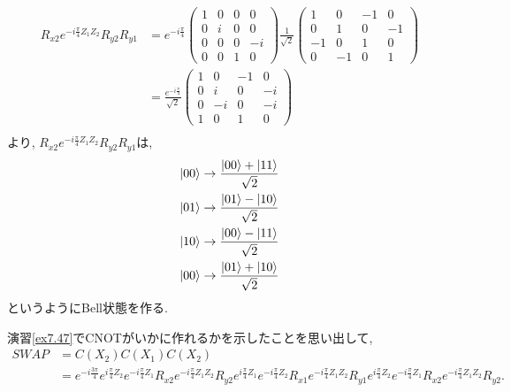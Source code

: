 \begin{ex}
    \label{ex7.48}
    \begin{align*}
        R_{x2} e^{-i \frac{\pi}{4} Z_1 Z_2} R_{y2}R_{y1}
         & =
        e^{-i\frac{\pi}{4}}
        \begin{pmatrix}
            1 & 0 & 0 & 0  \\
            0 & i & 0 & 0  \\
            0 & 0 & 0 & -i \\
            0 & 0 & 1 & 0
        \end{pmatrix}
        \frac{1}{\sqrt{2}}
        \begin{pmatrix}
            1  & 0  & -1 & 0  \\
            0  & 1  & 0  & -1 \\
            -1 & 0  & 1  & 0  \\
            0  & -1 & 0  & 1
        \end{pmatrix}
        \\
         & =
        \frac{e^{-i \frac{\pi}{4}}}{\sqrt{2}}
        \begin{pmatrix}
            1 & 0  & -1 & 0  \\
            0 & i  & 0  & -i \\
            0 & -i & 0  & -i \\
            1 & 0  & 1  & 0
        \end{pmatrix} \\
    \end{align*}
    より, $ R_{x2} e^{-i \frac{\pi}{4} Z_1 Z_2} R_{y2}R_{y1}$は,
    \begin{align*}
        \ket{00} \to \frac{\ket{00} + \ket{11}}{\sqrt{2}} \\
        \ket{01} \to \frac{\ket{01} - \ket{10}}{\sqrt{2}} \\
        \ket{10} \to \frac{\ket{00} - \ket{11}}{\sqrt{2}} \\
        \ket{00} \to \frac{\ket{01} + \ket{10}}{\sqrt{2}} \\
    \end{align*}
    というようにBell状態を作る.
\end{ex}

\begin{ex}
    \label{ex7.49}
    演習\ref{ex7.47}でCNOTがいかに作れるかを示したことを思い出して,
    \begin{align*}
        SWAP
         & = C(X_2) C(X_1) C(X_2)  \\
         & = e^{-i \frac{3\pi}{4}}
        e^{i \frac{\pi}{4}Z_2}e^{-i\frac{\pi}{4}Z_1}R_{x2} e^{-i \frac{\pi}{4} Z_1 Z_2}  R_{y2}
        e^{i \frac{\pi}{4}Z_1}e^{-i\frac{\pi}{4}Z_2}R_{x1} e^{-i \frac{\pi}{4} Z_1 Z_2}  R_{y1}
        e^{i \frac{\pi}{4}Z_2}e^{-i\frac{\pi}{4}Z_1}R_{x2} e^{-i \frac{\pi}{4} Z_1 Z_2}  R_{y2}.
    \end{align*}
\end{ex}

